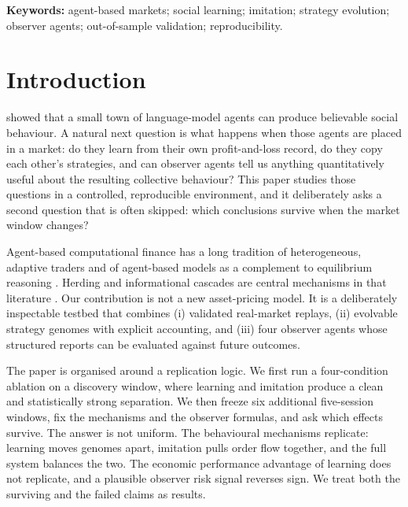 \documentclass[11pt]{article}
\begin{document}
\noindent\textbf{Keywords:} agent-based markets; social learning; imitation;
strategy evolution; observer agents; out-of-sample validation; reproducibility.

\section{Introduction}

\citet{park2023generative} showed that a small town of language-model agents can
produce believable social behaviour. A natural next question is what happens
when those agents are placed in a market: do they learn from their own
profit-and-loss record, do they copy each other's strategies, and can observer
agents tell us anything quantitatively useful about the resulting collective
behaviour? This paper studies those questions in a controlled, reproducible
environment, and it deliberately asks a second question that is often skipped:
which conclusions survive when the market window changes?

Agent-based computational finance has a long tradition of heterogeneous,
adaptive traders \citep{lebaron2006agent,hommes2006heterogeneous} and of
agent-based models as a complement to equilibrium reasoning
\citep{farmer2009economy,tesfatsion2006agent}. Herding and informational
cascades are central mechanisms in that literature
\citep{kirman1993ants,bikhchandani1992theory,cont2000herd}. Our contribution is
not a new asset-pricing model. It is a deliberately inspectable testbed that
combines (i) validated real-market replays, (ii) evolvable strategy genomes with
explicit accounting, and (iii) four observer agents whose structured reports can
be evaluated against future outcomes.

The paper is organised around a replication logic. We first run a four-condition
ablation on a discovery window, where learning and imitation produce a clean and
statistically strong separation. We then freeze six additional five-session
windows, fix the mechanisms and the observer formulas, and ask which effects
survive. The answer is not uniform. The behavioural mechanisms replicate: learning
moves genomes apart, imitation pulls order flow together, and the full system
balances the two. The economic performance advantage of learning does not
replicate, and a plausible observer risk signal reverses sign. We treat both the
surviving and the failed claims as results.
\end{document}

